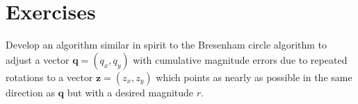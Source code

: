 \section{Exercises}
\label{cdta0:sexe0}

\begin{vworkexercisestatement}
\label{exe:cdta0:sexe0:01}
Develop an algorithm similar in spirit to the Bresenham circle
algorithm to adjust a vector $\mathbf{q} = (q_x, q_y)$ with 
cumulative magnitude errors due to repeated rotations to 
a vector $\mathbf{z} = (z_x, z_y)$ which points as nearly as
possible in the same direction as $\mathbf{q}$ but with 
a desired magnitude $r$.
\end{vworkexercisestatement}
\vworkexercisefooter{}


